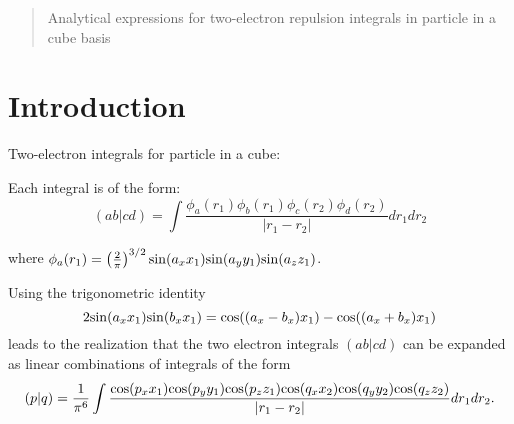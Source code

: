 \documentclass[11pt]{article}
\begin{document}
\maketitle

\begin{abstract}
Analytical expressions for two-electron repulsion integrals in particle
in a cube basis
\end{abstract}

\section{Introduction}
Two-electron integrals for particle in a cube:

Each integral is of the form:
\begin{equation}
(ab|cd) = \int \frac{ \phi_a(r_1) \phi_b(r_1) \phi_c(r_2) \phi_d(r_2)}{|r_1 - r_2|} dr_1 dr_2
\end{equation}

where $\phi_a(r_1) =\left(\frac{2}{\pi}\right)^{3/2} {\rm sin}(a_x x_1) {\rm sin}(a_y y_1) {\rm sin}(a_z z_1)$.

Using the trigonometric identity 
\begin{equation}
2 {\rm sin}(a_x x_1) {\rm sin}(b_x x_1) = {\rm cos}((a_x - b_x) x_1) - {\rm cos}((a_x + b_x) x_1)
\end{equation}
leads to the realization that the two electron integrals $(ab|cd)$ can be expanded as linear combinations of integrals of the form 
\begin{equation}
(p|q) = \frac{1}{\pi^6} \int \frac{{\rm cos}(p_x x_1) {\rm cos}(p_y y_1) {\rm cos}(p_z z_1)  {\rm cos}(q_x x_2) {\rm cos}(q_y y_2) {\rm cos}(q_z z_2) }{|r_1 - r_2|} dr_1 dr_2.
\end{equation}
\end{document}
